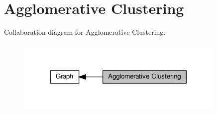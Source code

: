 \hypertarget{group__group__agglo}{}\section{Agglomerative Clustering}
\label{group__group__agglo}
Collaboration diagram for Agglomerative Clustering\+:
\nopagebreak
\begin{figure}[H]
\begin{center}
\leavevmode
\includegraphics[width=285pt]{group__group__agglo}
\end{center}
\end{figure}
